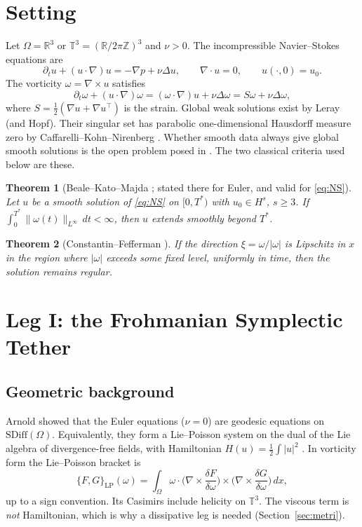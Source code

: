\documentclass[11pt]{amsart}
\newtheorem{theorem}{Theorem}[section]
\theoremstyle{definition}
\theoremstyle{remark}
\newcommand{\T}{\mathbb{T}}
\newcommand{\R}{\mathbb{R}}
\begin{document}
\section{Setting}
Let $\Omega=\R^3$ or $\T^3=(\R/2\pi\mathbb{Z})^3$ and $\nu>0$. The incompressible Navier--Stokes equations are
\begin{equation}\label{eq:NS}
\partial_t u+(u\cdot\nabla)u=-\nabla p+\nu\Delta u,\qquad \nabla\cdot u=0,\qquad u(\cdot,0)=u_0 .
\end{equation}
The vorticity $\omega=\nabla\times u$ satisfies
\begin{equation}\label{eq:vort}
\partial_t\omega+(u\cdot\nabla)\omega=(\omega\cdot\nabla)u+\nu\Delta\omega=S\omega+\nu\Delta\omega,
\end{equation}
where $S=\tfrac12(\nabla u+\nabla u^{\top})$ is the strain. Global weak solutions exist by Leray \cite{Leray1934} (and Hopf). Their singular set has parabolic one-dimensional Hausdorff measure zero by Caffarelli--Kohn--Nirenberg \cite{CKN1982}. Whether smooth data always give global smooth solutions is the open problem posed in \cite{FeffermanClay}. The two classical criteria used below are these.

\begin{theorem}[Beale--Kato--Majda \cite{BKM1984}; stated there for Euler, and valid for \eqref{eq:NS}]\label{thm:BKM}
Let $u$ be a smooth solution of \eqref{eq:NS} on $[0,T^*)$ with $u_0\in H^s$, $s\ge3$. If $\int_0^{T^*}\|\omega(t)\|_{L^\infty}\,dt<\infty$, then $u$ extends smoothly beyond $T^*$.
\end{theorem}

\begin{theorem}[Constantin--Fefferman \cite{ConstantinFefferman1993}]
If the direction $\xi=\omega/|\omega|$ is Lipschitz in $x$ in the region where $|\omega|$ exceeds some fixed level, uniformly in time, then the solution remains regular.
\end{theorem}

\section{Leg I: the Frohmanian Symplectic Tether}
\subsection{Geometric background}
Arnold \cite{Arnold1966} showed that the Euler equations ($\nu=0$) are geodesic equations on $\mathrm{SDiff}(\Omega)$. Equivalently, they form a Lie--Poisson system on the dual of the Lie algebra of divergence-free fields, with Hamiltonian $H(u)=\tfrac12\int|u|^2$ \cite{HMRW1985,ArnoldKhesin}. In vorticity form the Lie--Poisson bracket is
\begin{equation}\label{eq:LP}
\{F,G\}_{\mathrm{LP}}(\omega)=\int_\Omega \omega\cdot\Big(\nabla\times\frac{\delta F}{\delta\omega}\Big)\times\Big(\nabla\times\frac{\delta G}{\delta\omega}\Big)\,dx ,
\end{equation}
up to a sign convention. Its Casimirs include helicity on $\T^3$. The viscous term is \emph{not} Hamiltonian, which is why a dissipative leg is needed (Section~\ref{sec:metri}).
\end{document}
